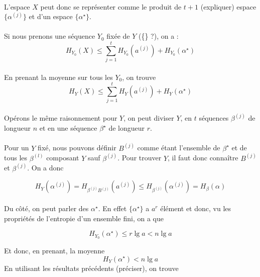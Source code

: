 	\paragraph{}
	L'espace ${X}$ peut donc se représenter comme le produit de $t+1$ 
	(expliquer) espace $\{\alpha^{(j)}\}$ et d'un espace 
	$\{\alpha^\star\}$.
	
	\paragraph{}
	Si nous prenons une séquence $Y_0$ fixée de $Y$ (\{\} ?), on a :
	\[
		H_{Y_0}(X)\le 
		\sum_{j=1}^tH_{Y_0}\left(a^{(j)}\right)+H_{Y_0}(\alpha^\star)
	\]
	
	\paragraph{}
	En prenant la moyenne sur tous les $Y_0$, on trouve
	\[H_Y(X)\le \sum_{j=1}^tH_Y\left(a^{(j)}\right)+H_Y(\alpha^\star)\]
	
	\paragraph{}
	Opérons le même raisonnement pour $Y$, on peut diviser $Y$, en $t$ 
	séquences $\beta^{(j)}$ de longueur $n$ et en une séquence ${\beta^\star}$
	de longueur $r$. 
	
	\paragraph{}
	Pour un $Y$ fixé, nous pouvons définir $B^{(j)}$ comme étant l'ensemble de
	$\beta^\star$ et de tous les $\beta^{(l)}$ composant $Y$ sauf 
	$\beta^{(j)}$. Pour trouver $Y$, il faut donc connaître $B^{(j)}$ 
	et $\beta^{(j)}$. On a 	donc
	
	\[
		H_Y(\alpha^{(j)}) = H_{\beta^{(j)}B^{(j)}}\left(a^{(j)}\right) \le 
		H_{\beta^{(j)}}\left(\alpha^{(j)}\right)=H_\beta(\alpha)
	\]
	
	\paragraph{}
	Du côté, on peut parler des $\alpha^\star$. En effet $\{\alpha^\star\}$ a 
	$a^r$ élément et donc, vu les propriétés de l'entropie d'un ensemble fini,
	on a que
	
	\[H_{Y_0}(\alpha^\star) \le r\lg a < n\lg a\]
	
	Et donc, en prenant, la moyenne 
	\[H_Y(\alpha^\star) < n \lg a\]
	En utilisant les résultats précédents (préciser), on trouve
	
